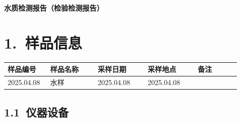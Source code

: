 \documentclass[UTF8,10pt,a4paper,fontset=fandol]{ctexart}
\newcommand{\fieldvalue}[1]{#1}
\newcommand{\handwritten}[1]{#1}
\begin{document}

\begin{center}
\textbf{水质检测报告（检验检测报告）}
\end{center}

\section*{1.\ 样品信息}

\begin{tabular}{|p{0.17\linewidth}|p{0.19\linewidth}|p{0.20\linewidth}|p{0.20\linewidth}|p{0.17\linewidth}|}
\hline
样品编号 & 样品名称 & 采样日期 & 采样地点 & 备注 \\
\hline
\fieldvalue{\handwritten{2025.04.08}} &
\fieldvalue{\handwritten{水样}} &
\fieldvalue{\handwritten{2025.04.08}} &
\fieldvalue{\handwritten{2025.04.08}} &
\\
\hline
\end{tabular}

\subsection*{1.1\ 仪器设备}
\end{document}
